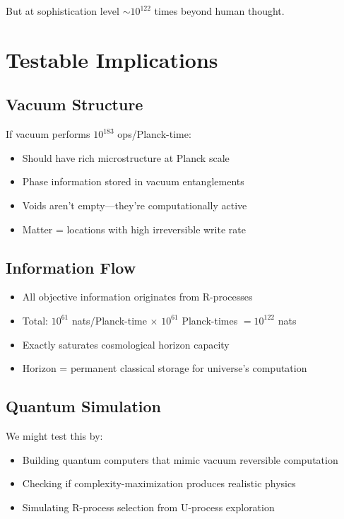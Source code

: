 ﻿\documentclass{article}
\begin{document}
But at sophistication level $\sim 10^{122}$ times beyond human thought.


\section{Testable Implications}


\subsection{Vacuum Structure}


If vacuum performs $10^{183}$ ops/Planck-time:
\begin{itemize}
\item Should have rich microstructure at Planck scale
\item Phase information stored in vacuum entanglements
\item Voids aren't empty—they're computationally active
\item Matter = locations with high irreversible write rate
\end{itemize}


\subsection{Information Flow}


\begin{itemize}
\item All objective information originates from R-processes
\item Total: $10^{61}$ nats/Planck-time $\times$ $10^{61}$ Planck-times $= 10^{122}$ nats
\item Exactly saturates cosmological horizon capacity
\item Horizon = permanent classical storage for universe's computation
\end{itemize}


\subsection{Quantum Simulation}


We might test this by:
\begin{itemize}
\item Building quantum computers that mimic vacuum reversible computation
\item Checking if complexity-maximization produces realistic physics
\item Simulating R-process selection from U-process exploration
\end{itemize}
\end{document}
